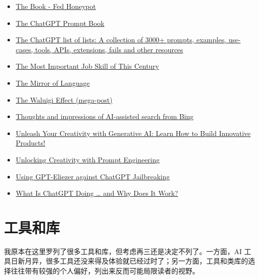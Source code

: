 \begin{itemize}
  \item \href{https://fedhoneypot.notion.site/25fdbdb69e9e44c6877d79e18336fe05?v=1d2bf4143680451986fd2836a04afbf4}{The Book - Fed Honeypot}
  \item \href{https://docs.google.com/presentation/d/17b_ocq-GL5lhV_bYSShzUgxL02mtWDoiw9xEroJ5m3Q/edit#slide=id.gc6f83aa91_0_79}{The ChatGPT Prompt Book}
  \item \href{https://medium.com/mlearning-ai/the-chatgpt-list-of-lists-a-collection-of-1500-useful-mind-blowing-and-strange-use-cases-8b14c35eb}{The ChatGPT list of lists: A collection of 3000+ prompts, examples, use-cases, tools, APIs, extensions, fails and other resources}
  \item \href{https://www.theatlantic.com/technology/archive/2023/02/openai-text-models-google-search-engine-bard-chatbot-chatgpt-prompt-writing/672991/}{The Most Important Job Skill of This Century}
  \item \href{https://deepfates.com/the-mirror-of-language}{The Mirror of Language}
  \item \href{https://www.lesswrong.com/posts/D7PumeYTDPfBTp3i7/the-waluigi-effect-mega-post}{The Waluigi Effect (mega-post)}
  \item \href{https://simonwillison.net/2023/Feb/24/impressions-of-bing/}{Thoughts and impressions of AI-assisted search from Bing}
  \item \href{https://youtube.com/watch?v=jqTkMpziGBU&feature=shares}{Unleash Your Creativity with Generative AI: Learn How to Build Innovative Products!}
  \item \href{https://youtube.com/watch?v=PFsbWAC4_rk&feature=shares}{Unlocking Creativity with Prompt Engineering}
  \item \href{https://www.alignmentforum.org/posts/pNcFYZnPdXyL2RfgA/using-gpt-eliezer-against-chatgpt-jailbreaking}{Using GPT-Eliezer against ChatGPT Jailbreaking}
  \item \href{https://writings.stephenwolfram.com/2023/02/what-is-chatgpt-doing-and-why-does-it-work/}{What Is ChatGPT Doing … and Why Does It Work?}
\end{itemize}

\section{工具和库}

我原本在这里罗列了很多工具和库，但考虑再三还是决定不列了。一方面，AI 工具日新月异，很多工具还没来得及体验就已经过时了；另一方面，工具和类库的选择往往带有较强的个人偏好，列出来反而可能局限读者的视野。

